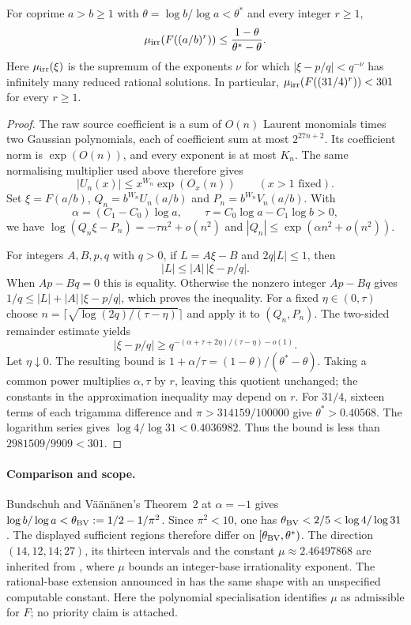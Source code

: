 \documentclass[11pt]{article}
\begin{document}
\begin{corollary}
\label{cor:rational-base-measure}
For coprime $a>b\ge1$ with $\theta=\log b/\log a<\theta^*$ and every
integer $r\ge1$,
\[
 \mu_{\rm irr}\!\left(F((a/b)^r)\right)
 \le\frac{1-\theta}{\theta^*-\theta}.
\]
Here $\mu_{\rm irr}(\xi)$ is the supremum of the exponents $\nu$ for which
$|\xi-p/q|<q^{-\nu}$ has infinitely many reduced rational solutions.
In particular, $\mu_{\rm irr}(F((31/4)^r))<301$ for every $r\ge1$.
\end{corollary}
\begin{proof}
The raw source coefficient is a sum of $O(n)$ Laurent monomials times two
Gaussian polynomials, each of coefficient sum at most $2^{27n+2}$.
Its coefficient norm is $\exp(O(n))$, and every exponent is at most $K_n$.
The same normalising multiplier used above therefore gives
\[
 |U_n(x)|\le x^{W_n}\exp(O_x(n))\qquad(x>1\text{ fixed}).
\]
Set $\xi=F(a/b)$, $Q_n=b^{W_n}U_n(a/b)$ and
$P_n=b^{W_n}V_n(a/b)$.  With
\[
 \alpha=(C_1-C_0)\log a,\qquad
 \tau=C_0\log a-C_1\log b>0,
\]
we have $\log(Q_n\xi-P_n)=-\tau n^2+o(n^2)$ and
$|Q_n|\le\exp(\alpha n^2+o(n^2))$.

For integers $A,B,p,q$ with $q>0$, if $L=A\xi-B$ and $2q|L|\le1$, then
\[
 |L|\le |A|\,|\xi-p/q|.
\]
When $Ap-Bq=0$ this is equality.  Otherwise the nonzero integer $Ap-Bq$
gives $1/q\le |L|+|A|\,|\xi-p/q|$, which proves the inequality.
For a fixed $\eta\in(0,\tau)$ choose
$n=\lceil\sqrt{\log(2q)/(\tau-\eta)}\rceil$ and apply it to $(Q_n,P_n)$.
The two-sided remainder estimate yields
\[
 |\xi-p/q|\ge
 q^{-(\alpha+\tau+2\eta)/(\tau-\eta)-o(1)}.
\]
Let $\eta\downarrow0$.  The resulting bound is
$1+\alpha/\tau=(1-\theta)/(\theta^*-\theta)$.
Taking a common power multiplies $\alpha,\tau$ by $r$, leaving this quotient
unchanged; the constants in the approximation inequality may depend on $r$.
For $31/4$, sixteen terms of each trigamma difference and
$\pi>314159/100000$ give $\theta^*>0.40568$.
The logarithm series gives $\log4/\log31<0.4036982$.
Thus the bound is less than $2981509/9909<301$.
\end{proof}

\paragraph{Comparison and scope.}
Bundschuh and V\"a\"an\"anen's Theorem~2 at $\alpha=-1$
\cite[p.~177]{bv1994} gives
$\log b/\log a<\theta_{\rm BV}:=1/2-1/\pi^2$.
Since $\pi^2<10$, one has $\theta_{\rm BV}<2/5<\log4/\log31$.
The displayed sufficient regions therefore differ on
$[\theta_{\rm BV},\theta^*)$.
The direction $(14,12,14;27)$, its thirteen intervals and the constant
$\mu\approx2.46497868$ are inherited from \cite[p.~162]{zudilin2004},
where $\mu$ bounds an integer-base irrationality exponent.
The rational-base extension announced in \cite[Section~2]{zudilin2016}
has the same shape with an unspecified computable constant.
Here the polynomial specialisation identifies $\mu$ as admissible for $F$;
no priority claim is attached.
\end{document}

